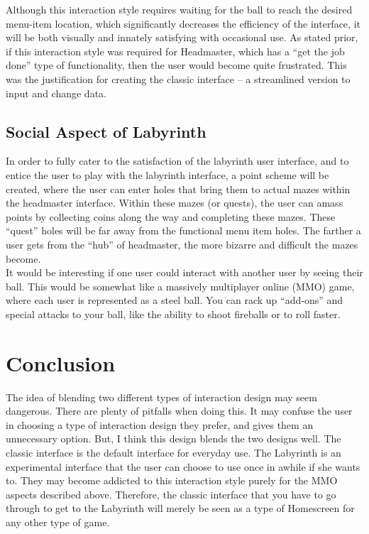 \documentclass{article}
\begin{document}
 Although this interaction style requires waiting for the ball to reach the desired menu-item location, which significantly decreases the efficiency of the interface, it will be both visually and innately satisfying with occasional use.  As stated prior, if this interaction style was required for Headmaster, which has a “get the job done” type of functionality, then the user would become quite frustrated.  This was the justification for creating the classic interface – a streamlined version to input and change data.

\subsection{Social Aspect of Labyrinth}

In order to fully cater to the satisfaction of the labyrinth user interface, and to entice the user to play with the labyrinth interface, a point scheme will be created, where the user can enter holes that bring them to actual mazes within the headmaster interface.  Within these mazes (or quests), the user can amass points by collecting coins along the way and completing these mazes.  These “quest” holes will be far away from the functional menu item holes.   The farther a user gets from the “hub” of headmaster, the more bizarre and difficult the mazes become.\\

It would be interesting if one user could interact with another user by seeing their ball.  This would be somewhat like a massively multiplayer online (MMO) game, where each user is represented as a steel ball.  You can rack up “add-ons” and special attacks to your ball, like the ability to shoot fireballs or to roll faster.

\section{Conclusion}

The idea of blending two different types of interaction design may seem dangerous.  There are plenty of pitfalls when doing this.  It may confuse the user in choosing a type of interaction design they prefer, and gives them an unnecessary option.  But, I think this design blends the two designs well.  The classic interface is the default interface for everyday use.  The Labyrinth is an experimental interface that the user can choose to use once in awhile if she wants to.  They may become addicted to this interaction style purely for the MMO aspects described above.  Therefore, the classic interface that you have to go through to get to the Labyrinth will merely be seen as a type of Homescreen for any other type of game.\\
\end{document}
